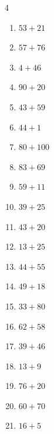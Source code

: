 \begin{multicols}{4}
\begin{enumerate}
  \item $53+21$
        \phantom{$=74$}

  \item $57+76$
        \phantom{$=133$}

  \item $4+46$
        \phantom{$=50$}

  \item $90+20$
        \phantom{$=110$}

  \item $43+59$
        \phantom{$=102$}

  \item $44+1$
        \phantom{$=45$}

  \item $80+100$
        \phantom{$=180$}

  \item $83+69$
        \phantom{$=152$}

  \item $59+11$
        \phantom{$=70$}

  \item $39+25$
        \phantom{$=64$}

  \item $43+20$
        \phantom{$=63$}

  \item $13+25$
        \phantom{$=38$}

  \item $44+55$
        \phantom{$=99$}

  \item $49+18$
        \phantom{$=67$}

  \item $33+80$
        \phantom{$=113$}

  \item $62+58$
        \phantom{$=120$}

  \item $39+46$
        \phantom{$=85$}

\columnbreak %

  \item $13+9$
        \phantom{$=22$}

  \item $76+20$
        \phantom{$=96$}

  \item $60+70$
        \phantom{$=130$}

  \item $16+5$
        \phantom{$=21$}


\end{enumerate}
\end{multicols}
